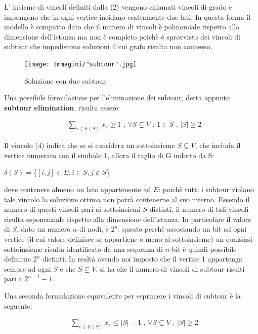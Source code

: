 \documentclass[11pt]{article}
\begin{document}
L' insieme di vincoli definiti dalla (2) vengono chiamati vincoli di grado e impongono che in ogni vertice incidano esattamente due lati. In questa forma il modello è  compatto dato che il numero di vincoli è polinomiale rispetto alla dimensione dell'istanza ma non è completo poichè è sprovvisto dei vincoli di subtour che impediscono soluzioni il cui grafo risulta non connesso.


\begin{figure}[htbp]
    \centering
    \texttt{[image: Immagini/"subtour".jpg]}
    \caption{Soluzione con due subtour}
\end{figure}

\vspace{2\baselineskip}

Una possibile formulazione per l'eliminazione dei subtour, detta appunto \textbf{subtour elimination}, risulta essere:

\begin{eqnarray}
&\displaystyle{\sum_{e \in E(S)}x_e \geq 1} \text{ , } \forall S \subsetneq V \text{ : } 1 \in S \text{ , } |S| \geq 2
\end{eqnarray}


Il vincolo (4) indica che se si considera un sottoinsieme $S \subsetneq V$, che includa il vertice numerato con il simbolo 1, allora il taglio di G indotto da S:

\begin{center}
$\delta(S) = $\{$ {[i,j]\in E : i \in S, j \notin S} $\} $ $
\end{center}

deve contenere almeno un lato appartenente ad $E$: poichè tutti i subtour violano tale vincolo la soluzione ottima non potrà contenerne al suo interno.  
Essendo il numero di questi vincoli pari ai sottoinsiemi $S$ distinti, il numero di tali vincoli risulta esponenziale rispetto alla dimensione dell'istanza. In particolare il valore di $S$, dato un numero $n$ di nodi, è $2^n$: questo perchè associando un bit ad ogni vertice (il cui valore definisce se appartiene o meno al sottoinsieme) un qualsiasi sottoinsieme risulta identificato da una sequenza di $n$ bit è quindi possibile definirne $2^n$ distinti. In realtà avendo noi imposto che il vertice 1 appartenga sempre ad ogni $S$ e che $S \subsetneq V$, si ha che il numero di vincoli di subtour risulti pari a  $2^{n-1} - 1$.

Una seconda formulazione equivalente per esprimere i vincoli di subtour è la seguente:

\begin{eqnarray}
&\displaystyle{\sum_{e \in E(S)}x_e \leq |S| - 1} \text{ , } \forall S \subsetneq V \text{ , } |S| \geq 2
\end{eqnarray}
\end{document}
